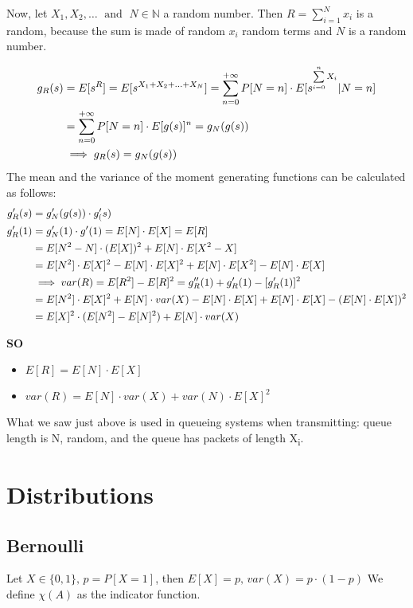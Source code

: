 Now, let $X_1, X_2, \dotsc \; \text{ and }\; N \in \mathbb{N}$ a random number. Then $R=\sum\limits_{i=1}^{N}x_i$
is a random, because the sum is made of random $x_i$ random terms and $N$ is a random number.

\begin{equation}$$
  \begin{split}
    g_R(s)&=E[s^R]=E[s^{X_1+X_2+\dotsc+X_N}]=\sum\limits_{n=0}^{+\infty} P[N=n]\cdot E[s^{\sum\limits_{i=0}^{n}X_i}|N=n]\\
    &=\sum\limits_{n=0}^{+\infty} P[N=n]\cdot E[g(s)]^n=g_N(g(s))
    \\ & \implies g_R(s) = g_N(g(s))
  \end{split}$$
\end{equation}
The mean and the variance of the moment generating functions can be calculated as follows:
\begin{equation}
$$
\begin{split}
  g'_R(s) &= g'_N(g(s)) \cdot g'_(s) \\
  g'_R(1) &= g_N'(1)\cdot g'(1) = E[N]\cdot E[X]=E[R]\\
  &=E[N^2-N]\cdot (E[X])^2 + E[N]\cdot E[X^2-X] \\
  &=E[N^2]\cdot E[X]^2 - E[N] \cdot E[X]^2 +E[N]\cdot E[X^2] - E[N]\cdot E[X]\\
  & \implies var(R) = E[R^2]-E[R]^2 = g''_R(1)+g'_R(1)-[g'_R(1)]^2\\
  &=E[N^2] \cdot E[X]^2 + E[N] \cdot var(X) - E[N]\cdot E[X] + E[N] \cdot E[X] - (E[N] \cdot E[X])^2 \\
  &= E[X]^2 \cdot (E[N^2]-E[N]^2) + E[N] \cdot var(X)
\end{split}
$$
\end{equation}

\textbf{SO}
\begin{itemize}
  \item $E[R] = E[N] \cdot E[X]$
  \item $var(R) = E[N] \cdot var(X) + var(N) \cdot E[X]^2$
\end{itemize}

What we saw just above is used in queueing systems when transmitting: queue length is N, random,
and the queue has packets of length X\textsubscript{i}.

\section{Distributions}
\subsection{Bernoulli}
Let $X \in \{0,1\}, \, p = P[X=1]$, then $E[X]=p, \, var(X)=p \cdot (1-p)$
We define $\chi(A)$ as the indicator function.

